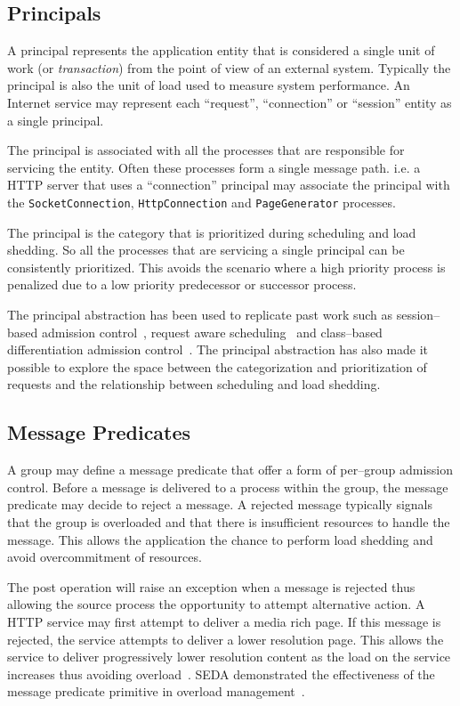 \documentclass[conference]{IEEEtran}
\begin{document}
\subsection{Principals}

A principal represents the application entity that is considered a single unit of work (or \emph{transaction}) from the point of view of an external system. Typically the principal is also the unit of load used to measure system performance. An Internet service may represent each ``request'', ``connection'' or ``session'' entity as a single principal.

The principal is associated with all the processes that are responsible for servicing the entity. Often these processes form a single message path. i.e. a HTTP server that uses a ``connection'' principal may associate the principal with the \verb+SocketConnection+, \verb+HttpConnection+ and \verb+PageGenerator+ processes.

The principal is the category that is prioritized during scheduling and load shedding. So all the processes that are servicing a single principal can be consistently prioritized. This avoids the scenario where a high priority process is penalized due to a low priority predecessor or successor process.

The principal abstraction has been used to replicate past work such as session--based admission control~\cite{Cherkasova:2002yb}, request aware scheduling~\cite{Zhou06RequestAware} and class--based differentiation admission control~\cite{welsh03Adaptive}. The principal abstraction has also made it possible to explore the space between the categorization and prioritization of requests and the relationship between scheduling and load shedding.

\subsection{Message Predicates}

A group may define a message predicate that offer a form of per--group admission control. Before a message is delivered to a process within the group, the message predicate may decide to reject a message. A rejected message typically signals that the group is overloaded and that there is insufficient resources to handle the message. This allows the application the chance to perform load shedding and avoid overcommitment of resources.

The post operation will raise an exception when a message is rejected thus allowing the source process the opportunity to attempt alternative action. A HTTP service may first attempt to deliver a media rich page. If this message is rejected, the service attempts to deliver a lower resolution page. This allows the service to deliver progressively lower resolution content as the load on the service increases thus avoiding overload~\cite{abdelzaher99web}. SEDA demonstrated the effectiveness of the message predicate primitive in overload management~\cite{welsh03Adaptive}. 
\end{document}
